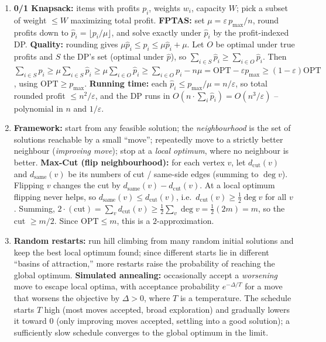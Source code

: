 \documentclass[11pt]{article}
\begin{document}
\begin{enumerate}[label=\textbf{A\arabic*.}, leftmargin=2.2em]
\item \textbf{0/1 Knapsack:} items with profits $p_i$, weights $w_i$, capacity $W$; pick a
subset of weight $\le W$ maximizing total profit. \textbf{FPTAS:} set $\mu =
\varepsilon\,p_{\max}/n$, round profits down to $\hat p_i = \lfloor p_i/\mu\rfloor$, and
solve exactly under $\hat p_i$ by the profit-indexed DP. \textbf{Quality:} rounding gives
$\mu\hat p_i \le p_i \le \mu\hat p_i + \mu$. Let $O$ be optimal under true profits and $S$
the DP's set (optimal under $\hat p$), so $\sum_{i\in S}\hat p_i \ge \sum_{i\in O}\hat
p_i$. Then $\sum_{i\in S}p_i \ge \mu\sum_{i\in S}\hat p_i \ge \mu\sum_{i\in O}\hat p_i \ge
\sum_{i\in O}p_i - n\mu = \mathrm{OPT} - \varepsilon p_{\max} \ge (1-\varepsilon)
\mathrm{OPT}$, using $\mathrm{OPT}\ge p_{\max}$. \textbf{Running time:} each $\hat p_i \le
p_{\max}/\mu = n/\varepsilon$, so total rounded profit $\le n^2/\varepsilon$, and the DP
runs in $O(n\cdot\sum_i\hat p_i) = O(n^3/\varepsilon)$ -- polynomial in $n$ and
$1/\varepsilon$.

\item \textbf{Framework:} start from any feasible solution; the \emph{neighbourhood} is
the set of solutions reachable by a small ``move''; repeatedly move to a strictly better
neighbour (\emph{improving move}); stop at a \emph{local optimum}, where no neighbour is
better. \textbf{Max-Cut (flip neighbourhood):} for each vertex $v$, let $d_{\text{cut}}(v)$
and $d_{\text{same}}(v)$ be its numbers of cut / same-side edges (summing to $\deg v$).
Flipping $v$ changes the cut by $d_{\text{same}}(v) - d_{\text{cut}}(v)$. At a local
optimum flipping never helps, so $d_{\text{same}}(v) \le d_{\text{cut}}(v)$, i.e.\
$d_{\text{cut}}(v) \ge \frac12\deg v$ for all $v$. Summing, $2\cdot(\text{cut}) = \sum_v
d_{\text{cut}}(v) \ge \frac12\sum_v \deg v = \frac12(2m) = m$, so the cut $\ge m/2$. Since
$\mathrm{OPT} \le m$, this is a $2$-approximation.

\item \textbf{Random restarts:} run hill climbing from many random initial solutions and
keep the best local optimum found; since different starts lie in different ``basins of
attraction,'' more restarts raise the probability of reaching the global optimum.
\textbf{Simulated annealing:} occasionally accept a \emph{worsening} move to escape local
optima, with acceptance probability $e^{-\Delta/T}$ for a move that worsens the objective
by $\Delta > 0$, where $T$ is a temperature. The schedule starts $T$ high (most moves
accepted, broad exploration) and gradually lowers it toward $0$ (only improving moves
accepted, settling into a good solution); a sufficiently slow schedule converges to the
global optimum in the limit.

\end{enumerate}
\end{document}
